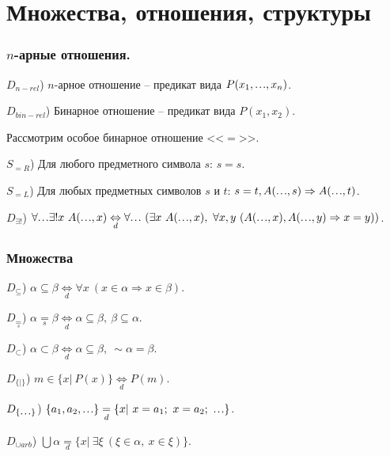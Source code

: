 \documentclass[a4paper]{article}
\newcommand\mydots{\hbox to 1em{.\hss.\hss.}}
\newcommand{\Def}[0]{\underset{d}{\Leftrightarrow}}
\newcommand{\defeq}[0]{\underset{d}{=}}
\newcommand{\eqs}[0]{\underset{s}{=}}
\begin{document}


\part{Множества, отношения, структуры}

\section{$n$-арные отношения.}

$D_{n-rel}$) $n$-арное отношение -- предикат вида $P(x_1, \mydots, x_n)$.

$D_{bin-rel}$) Бинарное отношение -- предикат вида $P(x_1, x_2)$.

Рассмотрим особое бинарное отношение <<$=$>>.

$S_{=R}$) Для любого предметного символа $s$: $s = s$.

$S_{=L}$) Для любых предметных символов $s$ и $t$: $s = t, A(\mydots, s) \Rightarrow A(\mydots, t)$.

$D_{\exists!}$) $\forall \mydots \exists! x~A(\mydots, x) \Def \forall \mydots~(\exists x~A(\mydots, x),~\forall x,y~(A(\mydots, x), A(\mydots, y) \Rightarrow x = y))$.

\section{Множества}

$D_{\subseteq}$) $\alpha \subseteq \beta \Def \forall x~(x \in \alpha \Rightarrow x \in \beta)$.

$D_{\eqs}$) $\alpha \eqs \beta \Def \alpha \subseteq \beta,~\beta \subseteq \alpha$.

$D_{\subset}$) $\alpha \subset \beta \Def \alpha \subseteq \beta,~\sim \alpha = \beta$.

$D_{\{|\}}$) $m \in \{x|~P(x)\} \Def P(m)$.

$D_{\{\mydots\}}$) $\{a_1, a_2, \mydots\} \defeq \{x|~x = a_1;~x = a_2;~\mydots\}$.

$D_{\cup arb}$) $\bigcup \alpha \defeq \{x|~\exists \xi~(\xi \in \alpha,~x \in \xi)\}$.
\end{document}

